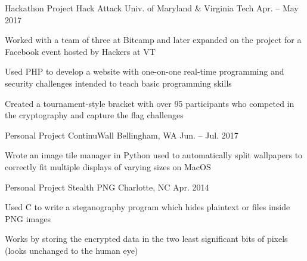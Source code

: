 

\begin{cventries}

  \cventry
    {Hackathon Project} %
    {Hack Attack} %
    {Univ. of Maryland \& Virginia Tech} %
    {Apr. – May 2017} %
    {
      \begin{cvitems} %
      \item {Worked with a team of three at Bitcamp and later expanded on the project for a Facebook event hosted by Hackers at VT}
      \item {Used PHP to develop a website with one-on-one real-time programming and security challenges intended to teach basic programming skills}
      \item {Created a tournament-style bracket with over 95 participants who competed in the cryptography and capture the flag challenges}
      \end{cvitems}
    }

  \cventry
    {Personal Project} %
    {ContinuWall} %
    {Bellingham, WA} %
    {Jun. – Jul. 2017} %
    {
      \begin{cvitems} %
      \item {Wrote an image tile manager in Python used to automatically split wallpapers to correctly fit multiple displays of varying sizes on MacOS}
      \end{cvitems}
    }

  \cventry
    {Personal Project} %
    {Stealth PNG} %
    {Charlotte, NC} %
    {Apr. 2014} %
    {
      \begin{cvitems} %
      \item {Used C to write a steganography program which hides plaintext or files inside PNG images}
      \item {Works by storing the encrypted data in the two least significant bits of pixels (looks unchanged to the human eye)}
      \end{cvitems}
    }

\end{cventries}
